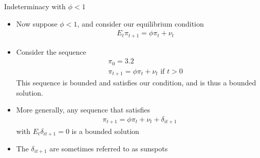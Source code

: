 \documentclass[9pt,xcolor={dvipsnames}]{beamer}
\newcommand{\bit}{\begin{itemize}}
\newcommand{\eit}{\end{itemize}}
\begin{document}
\begin{frame}{Indeterminacy with $\phi<1$}

\bit
\setlength\itemsep{1.5em}

\item Now suppose $\phi<1$, and consider our equilibrium condition
\begin{eqnarray}
&& E_t \pi_{t+1} = \phi \pi_t + \nu_t \nonumber
\end{eqnarray}

\item Consider the sequence 
\begin{eqnarray}
&& \pi_0 = 3.2 \nonumber \\
&& \pi_{t+1} = \phi \pi_t + \nu_t \text{ if } t>0 \nonumber
\end{eqnarray}
This sequence is bounded and satisfies our condition, and is thus a bounded solution.

\item More generally, any sequence that satisfies
\begin{eqnarray}
\pi_{t+1} =  \phi \pi_t + \nu_t +  \delta_{it+1} \nonumber
\end{eqnarray} 
with $E_t \delta_{it+1} = 0$ is a bounded solution

\item The $\delta_{it+1} $ are sometimes referred to as sunspots



\eit

\end{frame}
\end{document}
